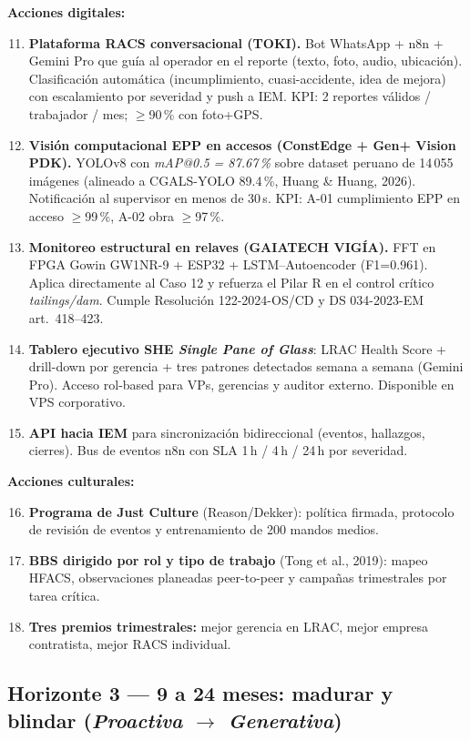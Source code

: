 \documentclass[12pt,a4paper]{article}
\begin{document}
\textbf{Acciones digitales:}
\begin{enumerate}\setcounter{enumi}{10}
\item \textbf{Plataforma RACS conversacional (TOKI).} Bot WhatsApp + n8n + Gemini Pro que guía al operador en el reporte (texto, foto, audio, ubicación). Clasificación automática (incumplimiento, cuasi-accidente, idea de mejora) con escalamiento por severidad y push a IEM. KPI: 2 reportes válidos / trabajador / mes; $\geq$90\,\% con foto+GPS.
\item \textbf{Visión computacional EPP en accesos (ConstEdge + Gen+ Vision PDK).} YOLOv8 con \emph{mAP@0.5 = 87.67\,\%} sobre dataset peruano de 14\,055 imágenes (alineado a CGALS-YOLO 89.4\,\%, Huang \& Huang, 2026). Notificación al supervisor en menos de 30\,s. KPI: A-01 cumplimiento EPP en acceso $\geq$99\,\%, A-02 obra $\geq$97\,\%.
\item \textbf{Monitoreo estructural en relaves (GAIATECH VIGÍA).} FFT en FPGA Gowin GW1NR-9 + ESP32 + LSTM--Autoencoder (F1=0.961). Aplica directamente al Caso 12 y refuerza el Pilar R en el control crítico \emph{tailings/dam}. Cumple Resolución 122-2024-OS/CD y DS 034-2023-EM art.~418--423.
\item \textbf{Tablero ejecutivo SHE \emph{Single Pane of Glass}}: LRAC Health Score + drill-down por gerencia + tres patrones detectados semana a semana (Gemini Pro). Acceso rol-based para VPs, gerencias y auditor externo. Disponible en VPS corporativo.
\item \textbf{API hacia IEM} para sincronización bidireccional (eventos, hallazgos, cierres). Bus de eventos n8n con SLA 1\,h / 4\,h / 24\,h por severidad.
\end{enumerate}

\textbf{Acciones culturales:}
\begin{enumerate}\setcounter{enumi}{15}
\item \textbf{Programa de Just Culture} (Reason/Dekker): política firmada, protocolo de revisión de eventos y entrenamiento de 200 mandos medios.
\item \textbf{BBS dirigido por rol y tipo de trabajo} (Tong et al., 2019): mapeo HFACS, observaciones planeadas peer-to-peer y campañas trimestrales por tarea crítica.
\item \textbf{Tres premios trimestrales:} mejor gerencia en LRAC, mejor empresa contratista, mejor RACS individual.
\end{enumerate}

\subsection{Horizonte 3 --- 9 a 24 meses: madurar y blindar (\emph{Proactiva $\to$ Generativa})}
\end{document}

